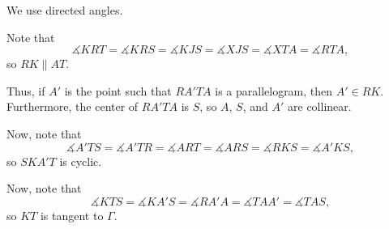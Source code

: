 We use directed angles.

Note that \[\measuredangle{KRT}=\measuredangle{KRS}=\measuredangle{KJS}=\measuredangle{XJS}=\measuredangle{XTA}=\measuredangle{RTA},\] so $RK\parallel AT$.

Thus, if $A'$ is the point such that $RA'TA$ is a parallelogram, then $A'\in RK$. Furthermore, the center of $RA'TA$ is $S$, so $A$, $S$, and $A'$ are collinear.

Now, note that \[\measuredangle{A'TS}=\measuredangle{A'TR}=\measuredangle{ART}=\measuredangle{ARS}=\measuredangle{RKS}=\measuredangle{A'KS},\] so $SKA'T$ is cyclic.

Now, note that \[\measuredangle{KTS}=\measuredangle{KA'S}=\measuredangle{RA'A}=\measuredangle{TAA'}=\measuredangle{TAS},\] so $KT$ is tangent to $\Gamma$.